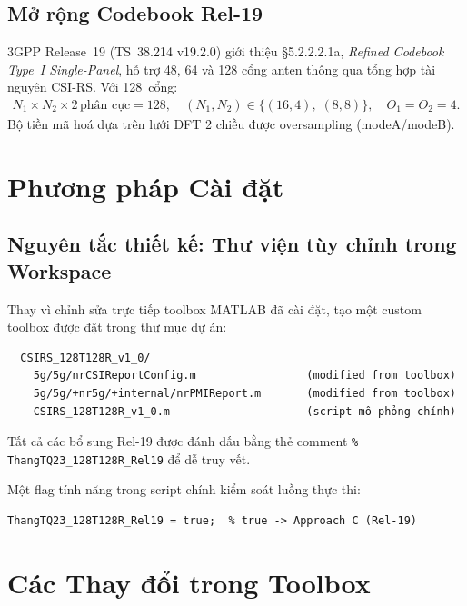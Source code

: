 \documentclass[11pt,a4paper]{article}
\begin{document}
\subsection{Mở rộng Codebook Rel-19}

3GPP Release~19 (TS~38.214 v19.2.0) giới thiệu \S5.2.2.2.1a,
\emph{Refined Codebook Type~I Single-Panel}, hỗ trợ 48, 64 và 128 cổng anten
thông qua tổng hợp tài nguyên CSI-RS. Với 128~cổng:
\begin{align}
  N_1 \times N_2 \times 2\,\text{phân cực} &= 128, \quad
  (N_1,N_2) \in \{(16,4),\;(8,8)\}, \quad O_1 = O_2 = 4.
\end{align}
Bộ tiền mã hoá dựa trên lưới DFT 2 chiều được oversampling (modeA/modeB).

\section{Phương pháp Cài đặt}

\subsection{Nguyên tắc thiết kế: Thư viện tùy chỉnh trong Workspace}

Thay vì chỉnh sửa trực tiếp toolbox MATLAB đã cài đặt, tạo một custom toolbox được đặt trong thư mục dự án:
\begin{verbatim}
  CSIRS_128T128R_v1_0/
    5g/5g/nrCSIReportConfig.m                 (modified from toolbox)
    5g/5g/+nr5g/+internal/nrPMIReport.m       (modified from toolbox)
    CSIRS_128T128R_v1_0.m                     (script mô phỏng chính)
\end{verbatim}
Tất cả các bổ sung Rel-19 được đánh dấu bằng thẻ comment \texttt{\% ThangTQ23\_128T128R\_Rel19} để dễ truy vết.

Một flag tính năng trong script chính kiểm soát luồng thực thi:
\begin{lstlisting}
ThangTQ23_128T128R_Rel19 = true;  % true -> Approach C (Rel-19)
\end{lstlisting}

\section{Các Thay đổi trong Toolbox}
\end{document}
